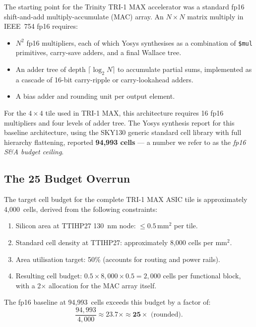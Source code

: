 The starting point for the Trinity TRI-1 MAX accelerator was a
standard fp16 shift-and-add multiply-accumulate (MAC) array.
An \(N \times N\) matrix multiply in IEEE~754 fp16 requires:

\begin{itemize}
  \item \(N^2\) fp16 multipliers, each of which Yosys synthesises as
        a combination of \texttt{\$mul} primitives, carry-save adders,
        and a final Wallace tree.
  \item An adder tree of depth \(\lceil \log_2 N \rceil\) to accumulate
        partial sums, implemented as a cascade of 16-bit carry-ripple
        or carry-lookahead adders.
  \item A bias adder and rounding unit per output element.
\end{itemize}

For the \(4 \times 4\) tile used in TRI-1 MAX, this architecture requires
16 fp16 multipliers and four levels of adder tree.
The Yosys synthesis report for this baseline architecture, using the
SKY130 generic standard cell library with full hierarchy flattening,
reported \textbf{94,993 cells} --- a number we refer to as the
\emph{fp16 S\&A budget ceiling}.

\subsection{The 25\texttimes{} Budget Overrun}

The target cell budget for the complete TRI-1 MAX ASIC tile is
approximately 4,000~cells, derived from the following constraints:

\begin{enumerate}
  \item Silicon area at TTIHP27 130~nm node: \(\leq 0.5\,\mathrm{mm}^2\) per tile.
  \item Standard cell density at TTIHP27: approximately 8,000 cells per \(\mathrm{mm}^2\).
  \item Area utilisation target: 50\% (accounts for routing and power rails).
  \item Resulting cell budget: \(0.5 \times 8{,}000 \times 0.5 = 2{,}000\) cells per
        functional block, with a 2\(\times\) allocation for the MAC array itself.
\end{enumerate}

The fp16 baseline at 94,993~cells exceeds this budget by a factor of:
\[
\frac{94{,}993}{4{,}000} \approx 23.7\times \approx \mathbf{25\times} \text{ (rounded)}.
\]

